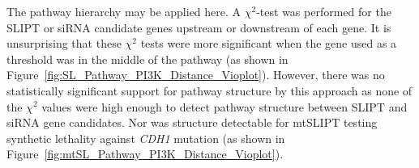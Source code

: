 


\begin{table*}[!htbp]
\caption{\gls{ANOVA} for Synthetic Lethality and PI3K Hierarchy}
\label{tab:SL_Pathway_PI3K_Distance_Counts}
\noindent{}
\end{table*}
The pathway hierarchy may be applied here. A $\chi^2$-test was performed for the \gls{SLIPT} or \gls{siRNA} candidate genes upstream or downstream of each gene. It is unsurprising that these $\chi^2$ tests were more significant when the gene used as a threshold was in the middle of the pathway (as shown in Figure~\ref{fig:SL_Pathway_PI3K_Distance_Vioplot}). However, there was no statistically significant support for pathway structure by this approach as none of the $\chi^2$ values were high enough to detect pathway structure between \gls{SLIPT} and \gls{siRNA} gene candidates. Nor was structure detectable for mtSLIPT testing synthetic lethality against \textit{CDH1} mutation (as shown in Figure~\ref{fig:mtSL_Pathway_PI3K_Distance_Vioplot}).


